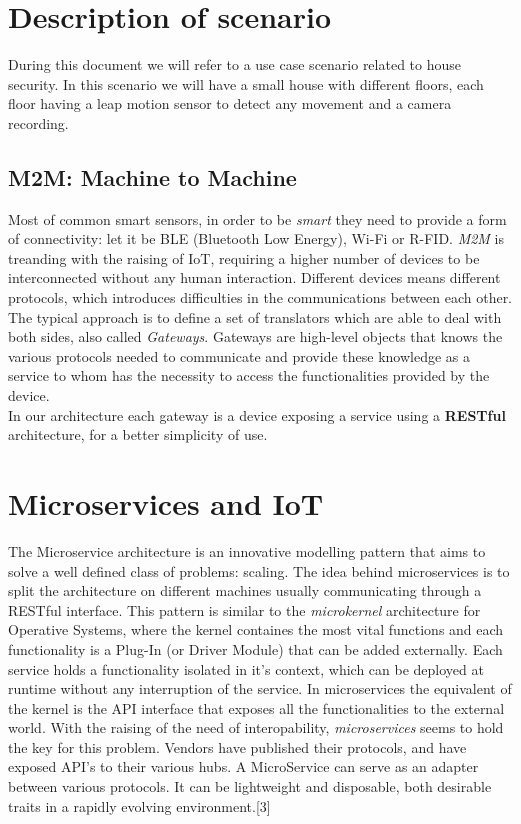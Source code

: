 
\section{Description of scenario}\label{ch1:opts}

During this document we will refer to a use case scenario related
to house security. In this scenario we will have a small house with different
floors, each floor having a leap motion sensor to detect any movement and a camera
recording.
\subsection{M2M: Machine to Machine}

Most of common smart sensors, in order to be \textit{smart} they need
to provide a form of connectivity: let it be BLE (Bluetooth Low Energy),
Wi-Fi or R-FID. \textit{M2M} is treanding with the raising of IoT,
requiring a higher number of devices to be interconnected without
any human interaction. Different devices means different protocols,
which introduces difficulties in the communications between each other.
The typical approach is to define a set of translators which
are able to deal with both sides, also called \textit{Gateways}.
Gateways are high-level objects that knows the various protocols
needed to communicate and provide these knowledge as a service to
whom has the necessity to access the functionalities provided by the
device. \\
In our architecture each gateway is a device exposing a service using
a \textbf{RESTful} architecture, for a better simplicity of use.

\section{Microservices and IoT}
\label{sub:microservicesiot}

The Microservice architecture is an innovative modelling pattern that aims
to solve a well defined class of problems: scaling.
The idea behind microservices is to split the architecture on different machines
usually communicating through a RESTful interface.
This pattern is similar to the \textit{microkernel} architecture for Operative Systems,
where the kernel containes the most vital functions and each functionality is a Plug-In
(or Driver Module) that can be added externally.
Each service holds a functionality isolated in it's context, which can be deployed
at runtime without any interruption of the service. In microservices the
equivalent of the kernel is the API interface that exposes all the functionalities
to the external world.
With the raising of the need of interopability, \textit{microservices}
seems to hold the key for this problem.
Vendors have published their protocols, and have exposed API’s to their various hubs.
A MicroService can serve as an adapter between various protocols. It can be lightweight and disposable,
both desirable traits in a rapidly evolving environment.[3]




